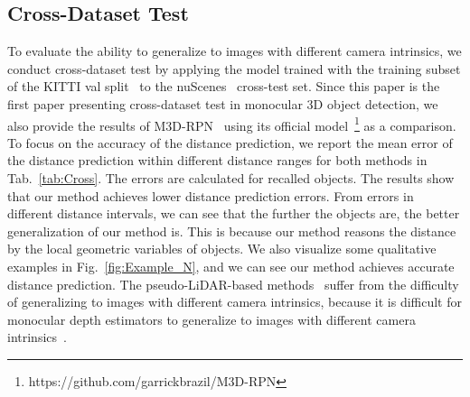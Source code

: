 \documentclass[10pt,twocolumn,letterpaper]{article}
\begin{document}
\subsection{Cross-Dataset Test}
To evaluate the ability to generalize to images with different camera intrinsics, we conduct cross-dataset test by applying the model trained with the training subset of the KITTI val split~\cite{DBLP:conf/nips/ChenKZBMFU15} to the nuScenes~\cite{DBLP:conf/cvpr/CaesarBLVLXKPBB20} cross-test set. Since this paper is the first paper presenting cross-dataset test in monocular 3D object detection, we also provide the results of M3D-RPN~\cite{DBLP:conf/iccv/Brazil019} using its official model~\footnote{https://github.com/garrickbrazil/M3D-RPN} as a comparison. To focus on the accuracy of the distance prediction, we report the mean error of the distance prediction within different distance ranges for both methods in Tab.~\ref{tab:Cross}. The errors are calculated for recalled objects. The results show that our method achieves lower distance prediction errors. From errors in different distance intervals, we can see that the further the objects are, the better generalization of our method is. This is because our method reasons the distance by the local geometric variables of objects. We also visualize some qualitative examples in Fig.~\ref{fig:Example_N}, and we can see our method achieves accurate distance prediction. The pseudo-LiDAR-based methods~\cite{DBLP:conf/cvpr/WangCGHCW19,DBLP:conf/iccv/MaWLZOF19,DBLP:conf/eccv/YeDSLTFDW20} suffer from the difficulty of generalizing to images with different camera intrinsics, because it is difficult for monocular depth estimators to generalize to images with different camera intrinsics~\cite{DBLP:conf/cvpr/FacilUZMBC19}.
\end{document}
